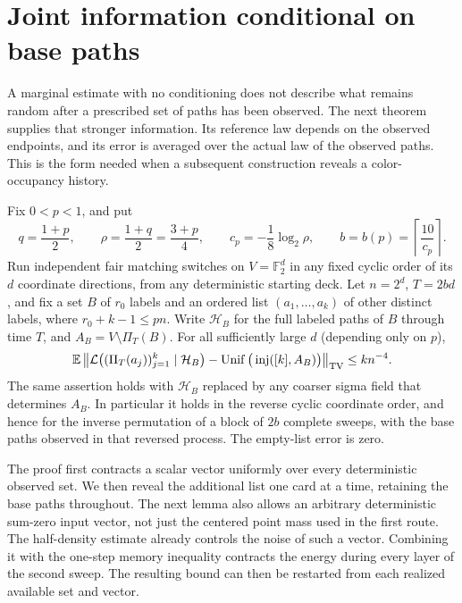 \section{Joint information conditional on base paths}\label{sec:base-paths}

A marginal estimate with no conditioning does not describe what remains
random after a prescribed set of paths has been observed. The next
theorem supplies that stronger information. Its reference law depends
on the observed endpoints, and its error is averaged over the actual
law of the observed paths. This is the form needed when a subsequent
construction reveals a color-occupancy history.

\begin{theorem}\label{thm:base-path-joint}
Fix $0<p<1$, and put
\[
 q=\frac{1+p}{2},\qquad \rho=\frac{1+q}{2}=\frac{3+p}{4},
 \qquad c_p=-\frac18\log_2\rho,\qquad
 b=b(p)=\left\lceil\frac{10}{c_p}\right\rceil.
\]
Run independent fair matching switches on $V=\mathbb F_2^d$ in any
fixed cyclic order of its $d$ coordinate directions, from any deterministic
starting deck. Let $n=2^d$, $T=2bd$, and fix a set $B$ of $r_0$ labels
and an ordered list $(a_1,\ldots,a_k)$ of other distinct labels, where
$r_0+k-1\le pn$. Write $\mathcal H_B$ for the full labeled paths of
$B$ through time $T$, and $A_B=V\setminus\Pi_T(B)$. For all sufficiently
large $d$ (depending only on $p$),
\begin{equation}\label{eq:base-path-joint}
 \mathbb E\left\|
 \mathcal L\big((\Pi_T(a_j))_{j=1}^k\mid\mathcal H_B\big)
 -\operatorname{Unif}\big(\operatorname{inj}([k],A_B)\big)
 \right\|_{\mathrm{TV}}\le k n^{-4}.
\end{equation}
The same assertion holds with $\mathcal H_B$ replaced by any coarser
sigma field that determines $A_B$. In particular it holds in the
reverse cyclic coordinate order, and hence for the inverse permutation
of a block of $2b$ complete sweeps, with the base paths observed in that
reversed process. The empty-list error is zero.
\end{theorem}

The proof first contracts a scalar vector uniformly over every
deterministic observed set. We then reveal the additional list one
card at a time, retaining the base paths throughout.
The next lemma also allows an arbitrary deterministic sum-zero input
vector, not just the centered point mass used in the first route.
The half-density estimate already controls the noise of such a vector.
Combining it with the one-step memory inequality contracts the energy
during every layer of the second sweep. The resulting bound can then
be restarted from each realized available set and vector.


